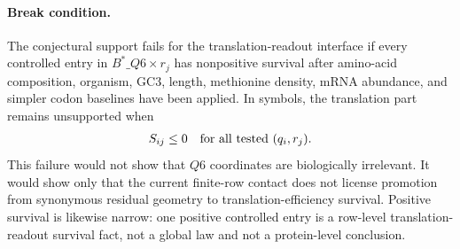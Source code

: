 \paragraph{Break condition.} The conjectural support fails for the translation-readout interface if every controlled entry in $B^*\_{Q6}\times r_j$ has nonpositive survival after amino-acid composition, organism, GC3, length, methionine density, mRNA abundance, and simpler codon baselines have been applied.  In symbols, the translation part remains unsupported when
$$
\begin{aligned}
S_{ij} \leq 0 \quad \hbox{for all tested } (q_i,r_j).
\end{aligned}
$$
This failure would not show that $Q6$ coordinates are biologically irrelevant.  It would show only that the current finite-row contact does not license promotion from synonymous residual geometry to translation-efficiency survival.  Positive survival is likewise narrow: one positive controlled entry is a row-level translation-readout survival fact, not a global law and not a protein-level conclusion.
